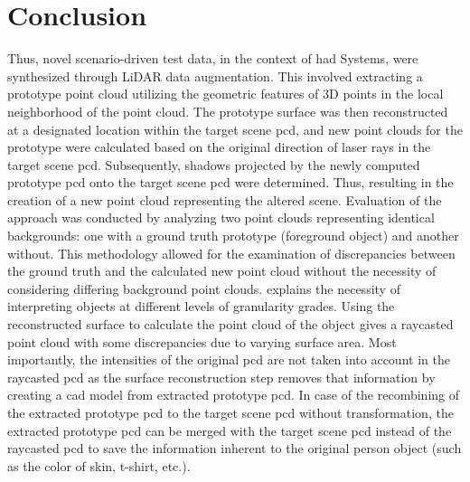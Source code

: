 \section{Conclusion}
Thus, novel scenario-driven test data, in the context of \acrfull{had} Systems, were synthesized through LiDAR data augmentation. This involved extracting a prototype point cloud utilizing the geometric features of 3D points in the local neighborhood of the point cloud. The prototype surface was then reconstructed at a designated location within the target scene \acrshort{pcd}, and new point clouds for the prototype were calculated based on the original direction of laser rays in the target scene \acrshort{pcd}. Subsequently, shadows projected by the newly computed prototype \acrshort{pcd} onto the target scene \acrshort{pcd} were determined. Thus, resulting in the creation of a new point cloud representing the altered scene. Evaluation of the approach was conducted by analyzing two point clouds representing identical backgrounds: one with a ground truth prototype (foreground object) and another without. This methodology allowed for the examination of discrepancies between the ground truth and the calculated new point cloud without the necessity of considering differing background point clouds. 
\parencite{padusinski2024machine} explains the necessity of interpreting objects at different levels of granularity grades. Using the reconstructed surface to calculate the point cloud of the object gives a raycasted point cloud with some discrepancies due to varying surface area. Most importantly, the intensities of the original \acrshort{pcd} are not taken into account in the raycasted \acrshort{pcd} as the surface reconstruction step removes that information by creating a \acrshort{cad} model from extracted prototype \acrshort{pcd}. In case of the recombining of the extracted prototype \acrshort{pcd} to the target scene \acrshort{pcd} without transformation, the extracted prototype \acrshort{pcd} can be merged with the target scene \acrshort{pcd} instead of the raycasted \acrshort{pcd} to save the information inherent to the original person object (such as the color of skin, t-shirt, etc.).

